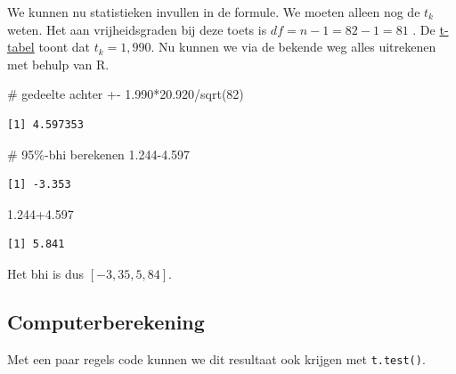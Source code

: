 \documentclass[
  letterpaper,
  DIV=11,
  numbers=noendperiod]{scrreprt}
\newenvironment{Shaded}{\begin{snugshade}}{\end{snugshade}}
\newcommand{\AttributeTok}[1]{\textcolor[rgb]{0.40,0.45,0.13}{#1}}
\newcommand{\CommentTok}[1]{\textcolor[rgb]{0.37,0.37,0.37}{#1}}
\newcommand{\ConstantTok}[1]{\textcolor[rgb]{0.56,0.35,0.01}{#1}}
\newcommand{\DecValTok}[1]{\textcolor[rgb]{0.68,0.00,0.00}{#1}}
\newcommand{\FloatTok}[1]{\textcolor[rgb]{0.68,0.00,0.00}{#1}}
\newcommand{\FunctionTok}[1]{\textcolor[rgb]{0.28,0.35,0.67}{#1}}
\newcommand{\NormalTok}[1]{\textcolor[rgb]{0.00,0.23,0.31}{#1}}
\newcommand{\SpecialCharTok}[1]{\textcolor[rgb]{0.37,0.37,0.37}{#1}}
\begin{document}
We kunnen nu statistieken invullen in de formule. We moeten alleen nog
de \(t_k\) weten. Het aan vrijheidsgraden bij deze toets is
\(df=n-1=82-1=81\) . De
\href{https://statisticsfundamentals.com/tables/t-distribution-table/}{t-tabel}
toont dat \(t_k=1,990\). Nu kunnen we via de bekende weg alles
uitrekenen met behulp van R.

\begin{Shaded}
\begin{Highlighting}[]
\CommentTok{\# gedeelte achter +{-}}
\FloatTok{1.990}\SpecialCharTok{*}\FloatTok{20.920}\SpecialCharTok{/}\FunctionTok{sqrt}\NormalTok{(}\DecValTok{82}\NormalTok{)}
\end{Highlighting}
\end{Shaded}

\begin{verbatim}
[1] 4.597353
\end{verbatim}

\begin{Shaded}
\begin{Highlighting}[]
\CommentTok{\# 95\%{-}bhi berekenen}
\FloatTok{1.244{-}4.597}
\end{Highlighting}
\end{Shaded}

\begin{verbatim}
[1] -3.353
\end{verbatim}

\begin{Shaded}
\begin{Highlighting}[]
\FloatTok{1.244+4.597}
\end{Highlighting}
\end{Shaded}

\begin{verbatim}
[1] 5.841
\end{verbatim}

Het bhi is dus \([-3,35, 5,84]\).

\subsection{Computerberekening}\label{computerberekening}

Met een paar regels code kunnen we dit resultaat ook krijgen met
\texttt{t.test()}.

\begin{Shaded}
\end{Shaded}
\end{document}
